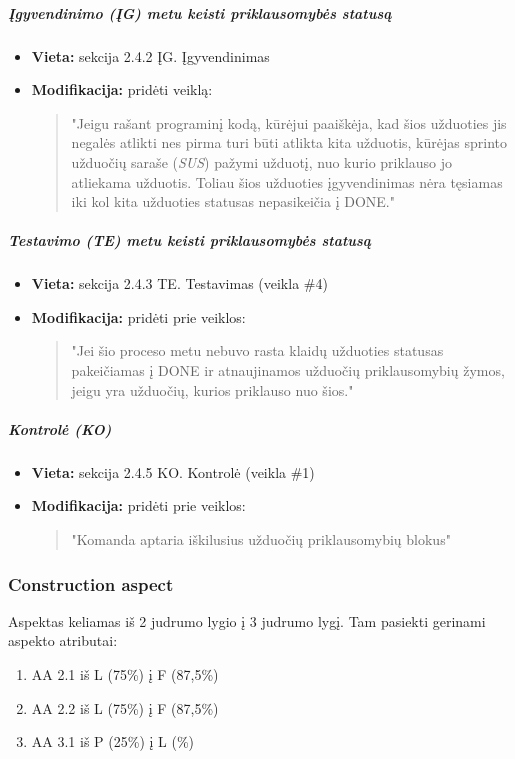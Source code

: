 \documentclass{article}
\begin{document}
\subparagraph{Įgyvendinimo (ĮG) metu keisti priklausomybės statusą}
\begin{itemize}
    \item \textbf{Vieta:} sekcija 2.4.2 ĮG. Įgyvendinimas
    \item \textbf{Modifikacija:} pridėti veiklą:
    \begin{quote}
        "Jeigu rašant programinį kodą, kūrėjui paaiškėja, kad šios užduoties jis negalės atlikti nes pirma turi būti atlikta kita užduotis, kūrėjas sprinto užduočių saraše (\textit{SUS}) pažymi užduotį, nuo kurio priklauso jo atliekama užduotis. Toliau šios užduoties įgyvendinimas nėra tęsiamas iki kol kita užduoties statusas nepasikeičia į DONE."
    \end{quote}
\end{itemize}

\subparagraph{Testavimo (TE) metu keisti priklausomybės statusą}
\begin{itemize}
    \item \textbf{Vieta:} sekcija 2.4.3 TE. Testavimas (veikla \#4)
    \item \textbf{Modifikacija:} pridėti prie veiklos:
    \begin{quote}
        "Jei šio proceso metu nebuvo rasta klaidų užduoties statusas pakeičiamas į DONE ir atnaujinamos užduočių priklausomybių žymos, jeigu yra užduočių, kurios priklauso nuo šios."
    \end{quote}
\end{itemize}

\subparagraph{Kontrolė (KO)}
\begin{itemize}
    \item \textbf{Vieta:} sekcija 2.4.5 KO. Kontrolė (veikla \#1)
    \item \textbf{Modifikacija:} pridėti prie veiklos:
    \begin{quote}
        "Komanda aptaria iškilusius užduočių priklausomybių blokus"
    \end{quote}
\end{itemize}

\subsubsection{Construction aspect}

Aspektas keliamas iš 2 judrumo lygio į 3 judrumo lygį. Tam pasiekti gerinami aspekto atributai:
\begin{enumerate}
\item AA 2.1 iš L (75\%) į F (87,5\%) 
\item AA 2.2 iš L (75\%) į F (87,5\%) 
\item AA 3.1 iš P (25\%) į L (\%) 
\end{enumerate}
\end{document}
